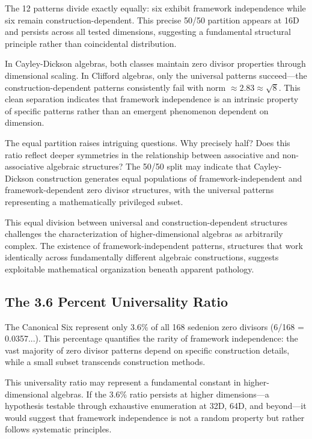 \documentclass[11pt]{article}
\begin{document}
The 12 patterns divide exactly equally: six exhibit framework independence while six remain construction-dependent. This precise 50/50 partition appears at 16D and persists across all tested dimensions, suggesting a fundamental structural principle rather than coincidental distribution.

In Cayley-Dickson algebras, both classes maintain zero divisor properties through dimensional scaling. In Clifford algebras, only the universal patterns succeed---the construction-dependent patterns consistently fail with norm $\approx 2.83 \approx \sqrt{8}$. This clean separation indicates that framework independence is an intrinsic property of specific patterns rather than an emergent phenomenon dependent on dimension.

The equal partition raises intriguing questions. Why precisely half? Does this ratio reflect deeper symmetries in the relationship between associative and non-associative algebraic structures? The 50/50 split may indicate that Cayley-Dickson construction generates equal populations of framework-independent and framework-dependent zero divisor structures, with the universal patterns representing a mathematically privileged subset.

This equal division between universal and construction-dependent structures challenges the characterization of higher-dimensional algebras as arbitrarily complex. The existence of framework-independent patterns, structures that work identically across fundamentally different algebraic constructions, suggests exploitable mathematical organization beneath apparent pathology.

\subsection{The 3.6 Percent Universality Ratio}

The Canonical Six represent only 3.6\% of all 168 sedenion zero divisors (6/168 = 0.0357...). This percentage quantifies the rarity of framework independence: the vast majority of zero divisor patterns depend on specific construction details, while a small subset transcends construction methods.

This universality ratio may represent a fundamental constant in higher-dimensional algebras. If the 3.6\% ratio persists at higher dimensions---a hypothesis testable through exhaustive enumeration at 32D, 64D, and beyond---it would suggest that framework independence is not a random property but rather follows systematic principles.
\end{document}

